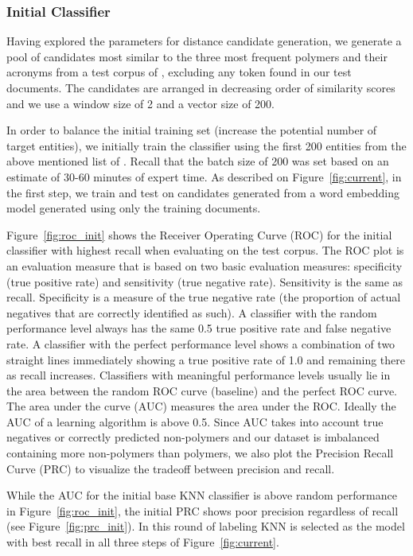 \subsubsection{Initial Classifier}
Having explored the parameters for distance candidate generation, we generate a pool of  candidates most similar to the three most frequent polymers and their acronyms from a test corpus of , excluding any token found in our test documents. 
The candidates are arranged in decreasing order of similarity scores and we use a window size of 2 and a vector size of 200. 

In order to balance the initial training set (increase the potential number of target entities),
we initially train the classifier using the first
200 entities from the above mentioned list of .
Recall that the batch size of 200 was set based on an estimate of 30-60 minutes of expert time.
As described on Figure~\ref{fig:current}, in the first step, we train and test on candidates generated from a word embedding model generated using only the training documents. 

Figure~\ref{fig:roc_init} shows the Receiver Operating Curve (ROC) for the initial classifier with highest recall when evaluating on the test corpus. 
The ROC plot is an evaluation measure that is based on two basic evaluation measures: specificity (true positive rate) and sensitivity (true negative rate).
Sensitivity is the same as recall. Specificity is a measure of the true negative rate (the proportion of actual negatives that are correctly identified as such).
A classifier with the random performance level always has the same 0.5 true positive rate and false negative rate.
A classifier with the perfect performance level shows a combination of two straight lines immediately showing a true positive rate of 1.0 and remaining there as recall increases.
Classifiers with meaningful performance levels usually lie in the area between the random ROC curve (baseline) and the perfect ROC curve. 
The area under the curve (AUC) measures the area under the ROC.
Ideally the AUC of a learning algorithm is above 0.5. 
Since AUC takes into account true negatives or correctly predicted non-polymers and our dataset is imbalanced containing more non-polymers than polymers, we also plot the Precision Recall Curve (PRC) to visualize the tradeoff between precision and recall.

While the AUC for the initial base KNN classifier is above random performance in Figure~\ref{fig:roc_init}, the initial PRC shows poor precision regardless of recall (see Figure~\ref{fig:prc_init}).
In this round of labeling KNN is selected as the model with best recall in all three steps of Figure~\ref{fig:current}.

